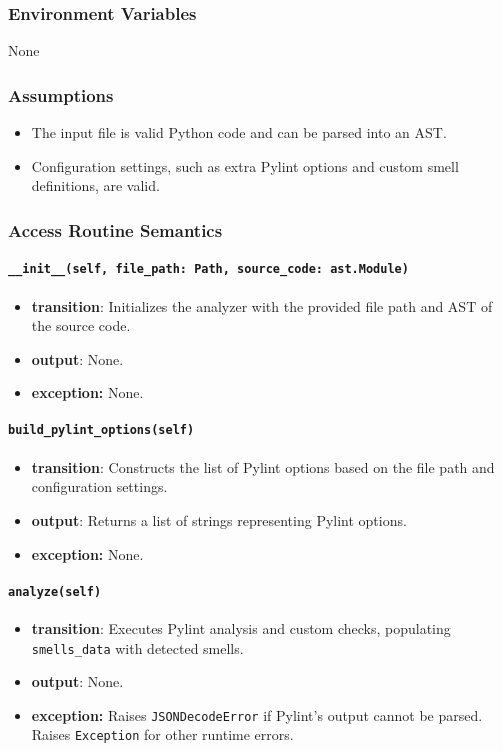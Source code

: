 \documentclass[12pt, titlepage]{article}
\begin{document}
\subsubsection{Environment Variables}
None

\subsubsection{Assumptions}
\begin{itemize}
  \item The input file is valid Python code and can be parsed into an AST.
  \item Configuration settings, such as extra Pylint options and custom smell definitions, are valid.
\end{itemize}

\subsubsection{Access Routine Semantics}

\paragraph{\texttt{\_\_init\_\_(self, file\_path: Path, source\_code: ast.Module)}}
\begin{itemize}
  \item \textbf{transition}: Initializes the analyzer with the provided file path and AST of the source code.
  \item \textbf{output}: None.
  \item \textbf{exception:} None.
\end{itemize}

\paragraph{\texttt{build\_pylint\_options(self)}}
\begin{itemize}
  \item \textbf{transition}: Constructs the list of Pylint options based on the file path and configuration settings.
  \item \textbf{output}: Returns a list of strings representing Pylint options.
  \item \textbf{exception:} None.
\end{itemize}

\paragraph{\texttt{analyze(self)}}
\begin{itemize}
  \item \textbf{transition}: Executes Pylint analysis and custom checks, populating \texttt{smells\_data} with detected smells.
  \item \textbf{output}: None.
  \item \textbf{exception:} Raises \texttt{JSONDecodeError} if Pylint's output cannot be parsed. Raises \texttt{Exception} for other runtime errors.
\end{itemize}
\end{document}
